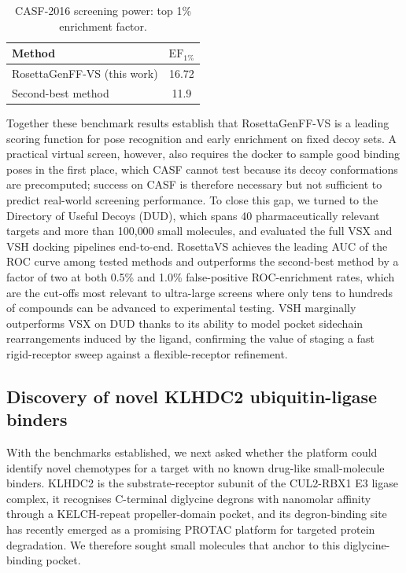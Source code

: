 \documentclass[11pt]{article}
\begin{document}
\begin{table}[htbp]
\centering
\caption{CASF-2016 screening power: top 1\% enrichment factor.}
\label{tab:casf_screening}
\begin{tabular}{lc}
\toprule
Method & $\mathrm{EF}_{1\%}$ \\
\midrule
RosettaGenFF-VS (this work) & 16.72 \\
Second-best method & 11.9 \\
\bottomrule
\end{tabular}
\end{table}

Together these benchmark results establish that RosettaGenFF-VS is a
leading scoring function for pose recognition and early enrichment on
fixed decoy sets. A practical virtual screen, however, also requires the
docker to sample good binding poses in the first place, which CASF
cannot test because its decoy conformations are precomputed; success on
CASF is therefore necessary but not sufficient to predict real-world
screening performance. To close this gap, we turned to the Directory of
Useful Decoys (DUD), which spans 40 pharmaceutically relevant targets
and more than 100{,}000 small molecules, and evaluated the full VSX and
VSH docking pipelines end-to-end. RosettaVS achieves the leading
AUC of the ROC curve among tested methods and outperforms the second-best
method by a factor of two at both 0.5\% and 1.0\% false-positive
ROC-enrichment rates, which are the cut-offs most relevant to ultra-large
screens where only tens to hundreds of compounds can be advanced to
experimental testing. VSH marginally outperforms VSX on DUD thanks to
its ability to model pocket sidechain rearrangements induced by the
ligand, confirming the value of staging a fast rigid-receptor sweep
against a flexible-receptor refinement.

\subsection{Discovery of novel KLHDC2 ubiquitin-ligase binders}

With the benchmarks established, we next asked whether the platform could
identify novel chemotypes for a target with no known drug-like
small-molecule binders. KLHDC2 is the substrate-receptor subunit of the
CUL2-RBX1 E3 ligase complex, it recognises C-terminal diglycine degrons
with nanomolar affinity through a KELCH-repeat propeller-domain pocket,
and its degron-binding site has recently emerged as a promising PROTAC
platform for targeted protein degradation. We therefore sought small
molecules that anchor to this diglycine-binding pocket.
\end{document}
